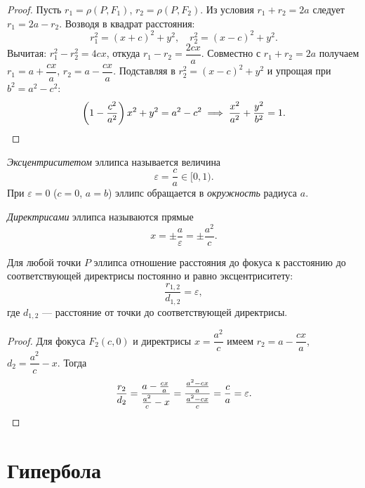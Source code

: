 \begin{proof}
Пусть $r_1 = \rho(P,F_1)$, $r_2 = \rho(P,F_2)$. Из условия $r_1 + r_2 = 2a$ следует $r_1 = 2a - r_2$. Возводя в квадрат расстояния:
\[
r_1^2 = (x+c)^2 + y^2, \quad r_2^2 = (x-c)^2 + y^2.
\]
Вычитая: $r_1^2 - r_2^2 = 4cx$, откуда $r_1 - r_2 = \dfrac{2cx}{a}$. Совместно с $r_1 + r_2 = 2a$ получаем $r_1 = a + \dfrac{cx}{a}$, $r_2 = a - \dfrac{cx}{a}$. Подставляя в $r_2^2 = (x-c)^2+y^2$ и упрощая при $b^2 = a^2 - c^2$:
\[
\left(1-\frac{c^2}{a^2}\right)x^2 + y^2 = a^2 - c^2
\;\Longrightarrow\;
\frac{x^2}{a^2}+\frac{y^2}{b^2}=1. \qedhere
\]
\end{proof}

\begin{defn}
\textit{Эксцентриситетом} эллипса называется величина
\begin{equation}\label{21.1.exc}
  \varepsilon = \frac{c}{a} \in [0, 1).
\end{equation}
При $\varepsilon = 0$ ($c=0$, $a=b$) эллипс обращается в \textit{окружность} радиуса $a$.
\end{defn}

\begin{defn}
\textit{Директрисами} эллипса называются прямые
\begin{equation}\label{21.1.dir}
  x = \pm \frac{a}{\varepsilon} = \pm \frac{a^2}{c}.
\end{equation}
\end{defn}

\begin{thm}
Для любой точки $P$ эллипса отношение расстояния до фокуса к расстоянию до соответствующей директрисы постоянно и равно эксцентриситету:
\begin{equation}\label{21.1.focal}
  \frac{r_{1,2}}{d_{1,2}} = \varepsilon,
\end{equation}
где $d_{1,2}$ --- расстояние от точки до соответствующей директрисы.
\end{thm}

\begin{proof}
Для фокуса $F_2(c,0)$ и директрисы $x = \dfrac{a^2}{c}$ имеем $r_2 = a - \dfrac{cx}{a}$, $d_2 = \dfrac{a^2}{c} - x$. Тогда
\[
\frac{r_2}{d_2} = \frac{a - \tfrac{cx}{a}}{\tfrac{a^2}{c}-x} = \frac{\tfrac{a^2-cx}{a}}{\tfrac{a^2-cx}{c}\vphantom{\tfrac{A}{A}}} = \frac{c}{a} = \varepsilon. \qedhere
\]
\end{proof}

\section{Гипербола}

